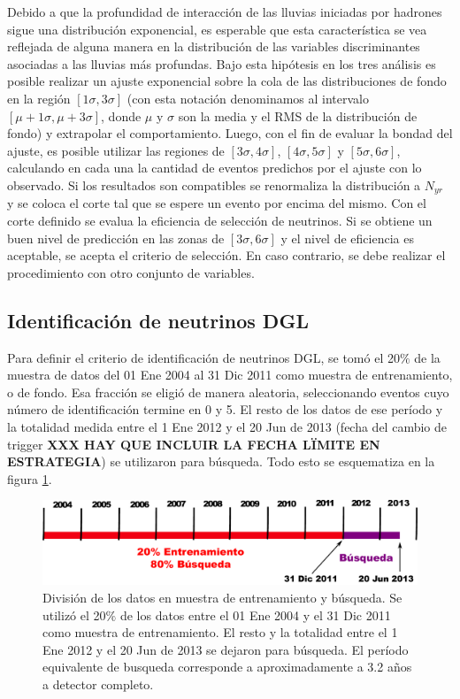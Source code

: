	Debido a que la profundidad de interacción de las lluvias iniciadas por hadrones sigue una distribución exponencial, es esperable que esta característica se vea reflejada de alguna manera en la distribución de las variables discriminantes asociadas a las lluvias más profundas.
	Bajo esta hipótesis en los tres análisis es posible realizar un ajuste exponencial sobre la cola de las distribuciones de fondo en la región $[1\sigma, 3\sigma]$ (con esta notación denominamos al intervalo $[\mu+1\sigma, \mu+3\sigma]$, donde $\mu$ y $\sigma$ son la media y el RMS de la distribución de fondo) y extrapolar el comportamiento.
	Luego, con el fin de evaluar la bondad del ajuste, es posible utilizar las regiones de $[3\sigma, 4\sigma]$, $[4\sigma, 5\sigma]$ y $[5\sigma, 6\sigma]$, calculando en cada una la cantidad de eventos predichos por el ajuste con lo observado.
	Si los resultados son compatibles se renormaliza la distribución a $N_{yr}$ y se coloca el corte tal que se espere un evento por encima del mismo. Con el corte definido se evalua la eficiencia de selección de neutrinos. Si se obtiene un buen nivel de predicción en las zonas de $[3\sigma, 6\sigma]$ y el nivel de eficiencia es aceptable, se acepta el criterio de selección. En caso contrario, se debe realizar el procedimiento con otro conjunto de variables.
	
	\subsection{Identificación de neutrinos DGL}
	
	Para definir el criterio de identificación de neutrinos DGL, se tomó el 20$\%$ de la muestra de datos del 01 Ene 2004 al 31 Dic 2011 como muestra de entrenamiento, o de fondo.
	Esa fracción se eligió de manera aleatoria, seleccionando eventos cuyo número de identificación termine en 0 y 5.
	El resto de los datos de ese período y la totalidad medida entre el 1 Ene 2012 y el 20 Jun de 2013 (fecha del cambio de trigger \textbf{XXX HAY QUE INCLUIR LA FECHA LÏMITE EN ESTRATEGIA}) se utilizaron para búsqueda.
	Todo esto se esquematiza en la figura \ref{fig:periodosDGL}.
	\begin{figure}[ht]
	\begin{center}
	\includegraphics[width=\textwidth]{fig/seleccionAuger/periodosDGL}
	\caption{División de los datos en muestra de entrenamiento y búsqueda. Se utilizó el 20$\%$ de los datos entre el 01 Ene 2004 y el 31 Dic 2011 como muestra de entrenamiento. El resto y la totalidad entre el 1 Ene 2012 y el 20 Jun de 2013 se dejaron para búsqueda. El período equivalente de busqueda corresponde a aproximadamente a 3.2 años a detector completo.}
	\label{fig:periodosDGL}
	\end{center}
	\end{figure}
	
